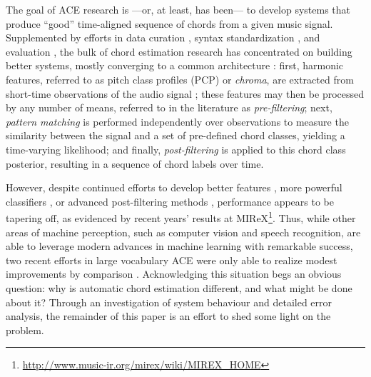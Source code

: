 \documentclass{article}
\begin{document}
The goal of ACE research is ---or, at least, has been--- to develop systems that produce ``good'' time-aligned sequence of chords from a given music signal.
Supplemented by efforts in data curation \cite{Burgoyne2011Expert}, syntax standardization \cite{Harte2005Symbolic}, and evaluation \cite{Pauwels2013Evaluating}, the bulk of chord estimation research has concentrated on building better systems, mostly converging to a common architecture \cite{Cho2014Relative}:
first, harmonic features, referred to as pitch class profiles (PCP) or \emph{chroma}, are extracted from short-time observations of the audio signal \cite{Fujishima1999Realtime};
these features may then be processed by any number of means, referred to in the literature as \emph{pre-filtering};
next, \emph{pattern matching} is performed independently over observations to measure the similarity between the signal and a set of pre-defined chord classes, yielding a time-varying likelihood;
and finally, \emph{post-filtering} is applied to this chord class posterior, resulting in a sequence of chord labels over time.

However, despite continued efforts to develop better features \cite{Mueller2010Towards}, more powerful classifiers \cite{Humphrey2012Rethinking}, or advanced post-filtering methods \cite{Boulanger2013Audio}, performance appears to be tapering off, as evidenced by recent years' results at MIReX\footnote{\url{http://www.music-ir.org/mirex/wiki/MIREX\_HOME}}.
Thus, while other areas of machine perception, such as computer vision and speech recognition, are able to leverage modern advances in machine learning with remarkable success, two recent efforts in large vocabulary ACE were only able to realize modest improvements by comparison \cite{Cho2014Improved, Humphrey2015Exploration}.
Acknowledging this situation begs an obvious question:
why is automatic chord estimation different, and what might be done about it?
Through an investigation of system behaviour and detailed error analysis, the remainder of this paper is an effort to shed some light on the problem.
\end{document}

